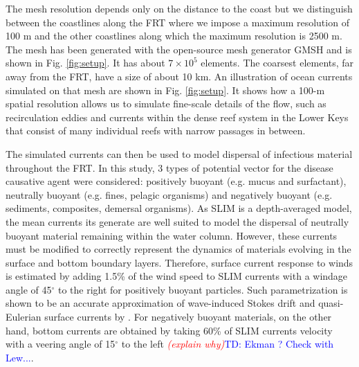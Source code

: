 \documentclass[utf8]{frontiersSCNS}
\newcommand{\emphc}[1]{\emph{\textcolor{red}{#1}}}
\begin{document}
The mesh resolution depends only on the distance to the coast but we distinguish between the coastlines along the FRT where we impose a maximum resolution of 100 m and the other coastlines along which the maximum resolution is 2500 m. The mesh has been generated with the open-source mesh generator GMSH \citep{Geuzaine2009} and is shown in Fig. \ref{fig:setup}. It has about $7 \times 10^5$ elements. The coarsest elements, far away from the FRT, have a size of about 10 km. An illustration of ocean currents simulated on that mesh are shown in Fig. \ref{fig:setup}. It shows how a 100-m spatial resolution allows us to simulate fine-scale details of the flow, such as recirculation eddies and currents within the dense reef system in the Lower Keys that consist of many individual reefs with narrow passages in between. 

The simulated currents can then be used to model dispersal of infectious material throughout the FRT. In this study, 3 types of potential vector for the disease causative agent were considered: positively buoyant (e.g. mucus and surfactant), neutrally buoyant (e.g. fines, pelagic organisms) and negatively buoyant (e.g. sediments, composites, demersal organisms). As SLIM is a depth-averaged model, the mean currents its generate are well suited to model the dispersal of neutrally buoyant material remaining within the water column. However, these currents must be modified to correctly represent the dynamics of materials evolving in the surface and bottom boundary layers. Therefore, surface current response to winds is estimated by adding 1.5\% of the wind speed to SLIM currents with a windage angle of 45$^\circ$ to the right for positively buoyant particles. Such parametrization is shown to be an accurate approximation of wave-induced Stokes drift and quasi-Eulerian surface currents by \citep{ardhuin2009observation}. For negatively buoyant materials, on the other hand, bottom currents are obtained by taking 60\% of SLIM currents velocity with a veering angle of 15$^\circ$ to the left \emphc{(explain why)}\textcolor{blue}{TD: Ekman ? Check with Lew...}.
\end{document}
